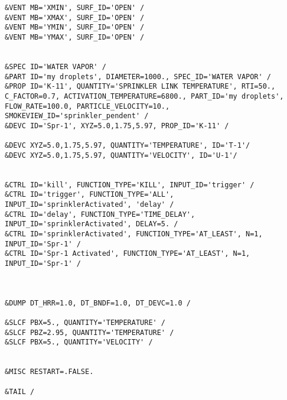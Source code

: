 \begin{lstlisting}[emptylines=0,basicstyle=\tiny]
&VENT MB='XMIN', SURF_ID='OPEN' /  
&VENT MB='XMAX', SURF_ID='OPEN' /  
&VENT MB='YMIN', SURF_ID='OPEN' /  
&VENT MB='YMAX', SURF_ID='OPEN' / 

 
&SPEC ID='WATER VAPOR' /
&PART ID='my droplets', DIAMETER=1000., SPEC_ID='WATER VAPOR' /
&PROP ID='K-11', QUANTITY='SPRINKLER LINK TEMPERATURE', RTI=50., C_FACTOR=0.7, ACTIVATION_TEMPERATURE=6800., PART_ID='my droplets', FLOW_RATE=100.0, PARTICLE_VELOCITY=10., SMOKEVIEW_ID='sprinkler_pendent' /
&DEVC ID='Spr-1', XYZ=5.0,1.75,5.97, PROP_ID='K-11' /

&DEVC XYZ=5.0,1.75,5.97, QUANTITY='TEMPERATURE', ID='T-1'/
&DEVC XYZ=5.0,1.75,5.97, QUANTITY='VELOCITY', ID='U-1'/


&CTRL ID='kill', FUNCTION_TYPE='KILL', INPUT_ID='trigger' /
&CTRL ID='trigger', FUNCTION_TYPE='ALL', INPUT_ID='sprinklerActivated', 'delay' /
&CTRL ID='delay', FUNCTION_TYPE='TIME_DELAY', INPUT_ID='sprinklerActivated', DELAY=5. /
&CTRL ID='sprinklerActivated', FUNCTION_TYPE='AT_LEAST', N=1, INPUT_ID='Spr-1' /
&CTRL ID='Spr-1 Activated', FUNCTION_TYPE='AT_LEAST', N=1, INPUT_ID='Spr-1' /



&DUMP DT_HRR=1.0, DT_BNDF=1.0, DT_DEVC=1.0 /

&SLCF PBX=5., QUANTITY='TEMPERATURE' /
&SLCF PBZ=2.95, QUANTITY='TEMPERATURE' /
&SLCF PBX=5., QUANTITY='VELOCITY' /


&MISC RESTART=.FALSE.

&TAIL /


\end{lstlisting}

